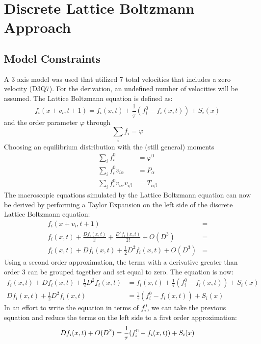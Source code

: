 \documentclass[12pt,a4paper]{article}
\begin{document}
\section{Discrete Lattice Boltzmann Approach}
\subsection{Model Constraints}
A 3 axis model was used that utilized 7 total velocities that includes a zero velocity (D3Q7). For the derivation, an undefined number of velocities will be assumed. The Lattice Boltzmann equation is defined as:
\begin{equation}
f_i(x+v_i, t+1) = f_i(x,t)+\frac{1}{\tau}(f_i^0-f_i(x,t)) + S_i(x)
\end{equation}
and the order parameter $\varphi$ through
\begin{equation}
\sum_i f_i = \varphi
\end{equation}
Choosing an equilibrium distribution with the (still general) moments
\begin{align}
\sum_i f_i^0 &= \varphi^0\\
\sum_i f_i^0 v_{i\alpha} &= P_\alpha\\
\sum_i f_i^0 v_{i\alpha} v_{i\beta} &= T_{\alpha\beta}
\end{align}
The macroscopic equations simulated by the Lattice Boltzmann equation can now be derived by performing a Taylor Expansion on the left side of the discrete Lattice Boltzmann equation:
\begin{align}
f_i(x+v_i, t+1) &= \\
f_i(x,t) + \frac{Df_i(x,t)}{1!} + \frac{D^2f_i(x,t)}{2!} + O(D^3) &= \\
f_i(x,t) + Df_i(x,t) + \frac{1}{2}D^2f_i(x,t) + O(D^3) &= 
\end{align}
Using a second order approximation, the terms with a derivative greater than order 3 can be grouped together and set equal to zero. The equation is now:
\begin{align}
f_i(x,t) + Df_i(x,t) + \frac{1}{2}D^2f_i(x,t) &= f_i(x,t)+\frac{1}{\tau}(f_i^0-f_i(x,t)) + S_i(x)\\
Df_i(x,t) + \frac{1}{2}D^2f_i(x,t) &= \frac{1}{\tau}(f_i^0-f_i(x,t)) + S_i(x)
\end{align}
In an effort to write the equation in terms of $f_i^0$, we can take the previous equation and reduce the terms on the left side to a first order approximation:
\begin{equation}
Df_i(x,t) + O(D^2) = \frac{1}{\tau}(f_i^0-f_i(x,t)) + S_i(x)\\
\end{equation}
\end{document}

